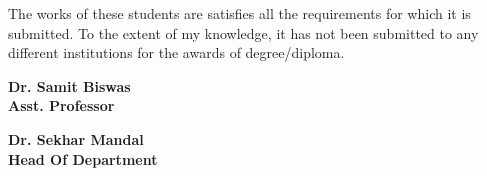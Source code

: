 \documentclass[a4paper]{article}
\begin{document}
\begin{titlepage}
    The works of these students are satisfies all the requirements for which it is submitted.
    To the extent of my knowledge, it has not been submitted to any different institutions for
    the awards of degree/diploma.

    \vspace{5cm}
    \begin{multicols}{2}
        \begin{center}
            \textbf{Dr. Samit Biswas\\Asst. Professor}\hspace{5cm}
        \end{center}
        \begin{center}
            \textbf{Dr. Sekhar Mandal\\Head Of Department}
        \end{center}
        \vspace{0.5cm}
    \end{multicols}
    \vfill
\end{titlepage}

\pagebreak
\newpage
\end{document}
